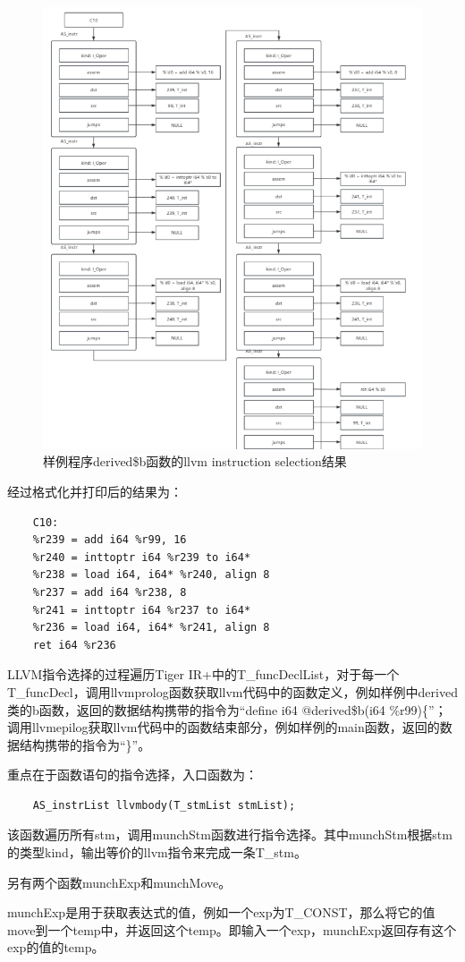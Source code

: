 \documentclass{article}
\begin{document}
\begin{figure}[h]
  \centering
  \includegraphics[width=.6\linewidth]{pics/assem.jpg}
  \caption{样例程序derived\$b函数的llvm instruction selection结果}
  \label{fig:asm}
\end{figure}

经过格式化并打印后的结果为：

\begin{lstlisting}
    C10:
    %r239 = add i64 %r99, 16
    %r240 = inttoptr i64 %r239 to i64*
    %r238 = load i64, i64* %r240, align 8
    %r237 = add i64 %r238, 8
    %r241 = inttoptr i64 %r237 to i64*
    %r236 = load i64, i64* %r241, align 8
    ret i64 %r236
\end{lstlisting}

LLVM指令选择的过程遍历Tiger IR+中的T\_funcDeclList，对于每一个T\_funcDecl，调用llvmprolog函数获取llvm代码中的函数定义，例如样例中derived类的b函数，返回的数据结构携带的指令为“define i64 @derived\$b(i64 \%r99)\{”；调用llvmepilog获取llvm代码中的函数结束部分，例如样例的main函数，返回的数据结构携带的指令为“\}”。

重点在于函数语句的指令选择，入口函数为：

    \begin{lstlisting}
    AS_instrList llvmbody(T_stmList stmList);
    \end{lstlisting}

该函数遍历所有stm，调用munchStm函数进行指令选择。其中munchStm根据stm的类型kind，输出等价的llvm指令来完成一条T\_stm。

另有两个函数munchExp和munchMove。

munchExp是用于获取表达式的值，例如一个exp为T\_CONST，那么将它的值move到一个temp中，并返回这个temp。即输入一个exp，munchExp返回存有这个exp的值的temp。
\end{document}
